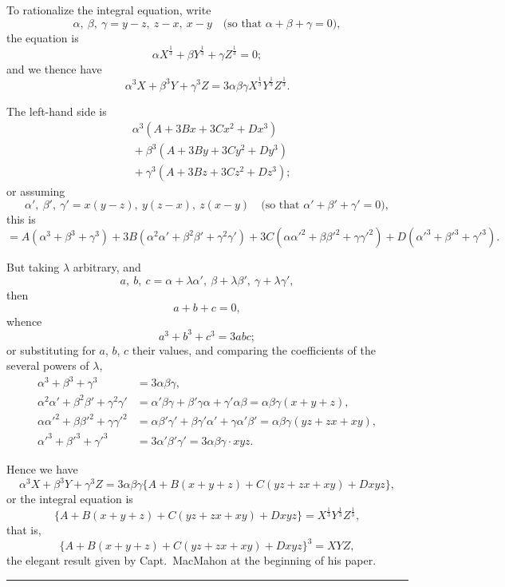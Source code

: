 \documentclass[11pt,a4paper]{article}
\theoremstyle{plain}
\theoremstyle{definition}
\theoremstyle{remark}
\begin{document}
To rationalize the integral equation, write
\[
\alpha,\ \beta,\ \gamma = y-z,\ z-x,\ x-y \quad \text{(so that $\alpha+\beta+\gamma=0$)},
\]
the equation is
\[
\alpha X^{\frac{1}{3}} + \beta Y^{\frac{1}{3}} + \gamma Z^{\frac{1}{3}} = 0;
\]
and we thence have
\[
\alpha^3 X + \beta^3 Y + \gamma^3 Z = 3\alpha\beta\gamma X^{\frac{1}{3}}Y^{\frac{1}{3}}Z^{\frac{1}{3}}.
\]

The left-hand side is
\begin{align*}
&\alpha^3 (A + 3Bx + 3Cx^2 + Dx^3) \\
&{}+ \beta^3 (A + 3By + 3Cy^2 + Dy^3) \\
&{}+ \gamma^3 (A + 3Bz + 3Cz^2 + Dz^3);
\end{align*}
or assuming
\[
\alpha',\ \beta',\ \gamma' = x(y-z),\ y(z-x),\ z(x-y) \quad \text{(so that $\alpha'+\beta'+\gamma'=0$)},
\]
this is
\[
= A(\alpha^3+\beta^3+\gamma^3) + 3B(\alpha^2\alpha'+\beta^2\beta'+\gamma^2\gamma')
+ 3C(\alpha\alpha'^2+\beta\beta'^2+\gamma\gamma'^2) + D(\alpha'^3+\beta'^3+\gamma'^3).
\]

But taking $\lambda$ arbitrary, and
\[
a,\ b,\ c = \alpha+\lambda\alpha',\ \beta+\lambda\beta',\ \gamma+\lambda\gamma',
\]
then
\[
a+b+c=0,
\]
whence
\[
a^3+b^3+c^3 = 3abc;
\]
or substituting for $a$, $b$, $c$ their values, and comparing the coefficients of the several powers of $\lambda$,
\begin{align*}
\alpha^3+\beta^3+\gamma^3 &= 3\alpha\beta\gamma, \\
\alpha^2\alpha'+\beta^2\beta'+\gamma^2\gamma'
&= \alpha'\beta\gamma + \beta'\gamma\alpha + \gamma'\alpha\beta
= \alpha\beta\gamma(x+y+z), \\
\alpha\alpha'^2+\beta\beta'^2+\gamma\gamma'^2
&= \alpha\beta'\gamma' + \beta\gamma'\alpha' + \gamma\alpha'\beta'
= \alpha\beta\gamma(yz+zx+xy), \\
\alpha'^3+\beta'^3+\gamma'^3 &= 3\alpha'\beta'\gamma' = 3\alpha\beta\gamma\cdot xyz.
\end{align*}

Hence we have
\[
\alpha^3 X + \beta^3 Y + \gamma^3 Z
= 3\alpha\beta\gamma\{A + B(x+y+z) + C(yz+zx+xy) + Dxyz\},
\]
or the integral equation is
\[
\{A + B(x+y+z) + C(yz+zx+xy) + Dxyz\} = X^{\frac{1}{3}}Y^{\frac{1}{3}}Z^{\frac{1}{3}},
\]
that is,
\[
\{A + B(x+y+z) + C(yz+zx+xy) + Dxyz\}^3 = XYZ,
\]
the elegant result given by Capt.~MacMahon at the beginning of his paper.

\begin{center}
\rule{0.4\textwidth}{0.4pt}
\end{center}
\end{document}

